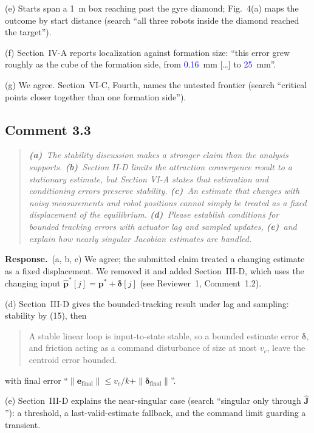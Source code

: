 \documentclass[10pt]{article}
\newcommand{\newnum}[1]{\textcolor{blue}{#1}}        %
\newcommand{\resp}{\par\textbf{Response.}~}
\newenvironment{newtext}{\begin{quote}\small\sloppy}{\end{quote}}
\begin{document}
(e) Starts span a 1~m box reaching past the gyre diamond; Fig.~4(a) maps the outcome by start distance (search ``all three robots inside the diamond reached the target'').

(f) Section~IV-A reports localization against formation size: ``this error grew roughly as the cube of the formation side, from \newnum{0.16}~mm [\ldots] to \newnum{25}~mm''.

(g) We agree. Section~VI-C, Fourth, names the untested frontier (search ``critical points closer together than one formation side'').

\subsection*{Comment 3.3}

\begin{quote}\itshape
\textbf{(a)}~The stability discussion makes a stronger claim than the analysis supports.
\textbf{(b)}~Section II-D limits the attraction convergence result to a stationary estimate, but Section VI-A states that estimation and conditioning errors preserve stability.
\textbf{(c)}~An estimate that changes with noisy measurements and robot positions cannot simply be treated as a fixed displacement of the equilibrium.
\textbf{(d)}~Please establish conditions for bounded tracking errors with actuator lag and sampled updates,
\textbf{(e)}~and explain how nearly singular Jacobian estimates are handled.
\end{quote}

\resp (a, b, c) We agree; the submitted claim treated a changing estimate as a fixed displacement. We removed it and added Section~III-D, which uses the changing input $\hat{\mathbf{p}}^*[j] = \mathbf{p}^* + \boldsymbol\delta[j]$ (see Reviewer~1, Comment~1.2).

(d) Section~III-D gives the bounded-tracking result under lag and sampling: stability by (15), then
\begin{newtext}
A stable linear loop is input-to-state stable, so a bounded estimate error $\boldsymbol{\delta}$, and friction acting as a command disturbance of size at most $v_c$, leave the centroid error bounded.
\end{newtext}
with final error ``$\|\mathbf{e}_{\text{final}}\| \le v_c/k + \|\boldsymbol{\delta}_{\text{final}}\|$''.

(e) Section~III-D explains the near-singular case (search ``singular only through $\hat{\mathbf{J}}$''): a threshold, a last-valid-estimate fallback, and the command limit guarding a transient.
\end{document}
